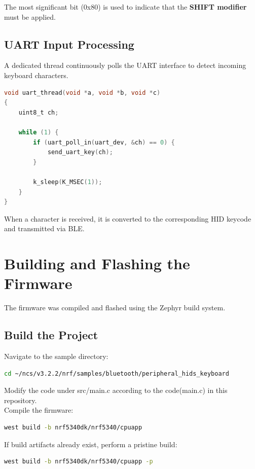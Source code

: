 \documentclass[conference]{IEEEtran}
\begin{document}
The most significant bit (0x80) is used to indicate that the \textbf{SHIFT modifier} must be applied.

\subsection{UART Input Processing}

A dedicated thread continuously polls the UART interface to detect incoming keyboard characters.

\begin{lstlisting}[language=C]
void uart_thread(void *a, void *b, void *c)
{
    uint8_t ch;

    while (1) {
        if (uart_poll_in(uart_dev, &ch) == 0) {
            send_uart_key(ch);
        }

        k_sleep(K_MSEC(1));
    }
}
\end{lstlisting}

When a character is received, it is converted to the corresponding HID keycode and transmitted via BLE.

\section{Building and Flashing the Firmware}

The firmware was compiled and flashed using the Zephyr build system.

\subsection{Build the Project}

Navigate to the sample directory:

\begin{lstlisting}[language=bash]
cd ~/ncs/v3.2.2/nrf/samples/bluetooth/peripheral_hids_keyboard
\end{lstlisting}

Modify the code under src/main.c according to the code(main.c) in this repository. \\
Compile the firmware:

\begin{lstlisting}[language=bash]
west build -b nrf5340dk/nrf5340/cpuapp
\end{lstlisting}

If build artifacts already exist, perform a pristine build:

\begin{lstlisting}[language=bash]
west build -b nrf5340dk/nrf5340/cpuapp -p
\end{lstlisting}
\end{document}
